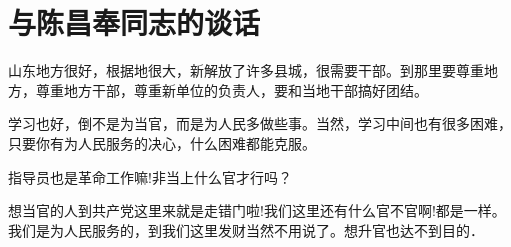 \section[与陈昌奉同志的谈话（一九五八年八月九日）]{与陈昌奉同志的谈话}


山东地方很好，根据地很大，新解放了许多县城，很需要干部。到那里要尊重地方，尊重地方干部，尊重新单位的负责人，要和当地干部搞好团结。

学习也好，倒不是为当官，而是为人民多做些事。当然，学习中间也有很多困难，只要你有为人民服务的决心，什么困难都能克服。

指导员也是革命工作嘛!非当上什么官才行吗？

想当官的人到共产党这里来就是走错门啦!我们这里还有什么官不官啊!都是一样。我们是为人民服务的，到我们这里发财当然不用说了。想升官也达不到目的．


